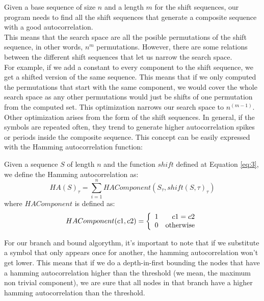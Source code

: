   Given a base sequence of size $n$ and a length $m$ for the shift sequences,
  our program needs to find all the shift sequences that generate a composite
  sequence with a good autocorrelation.\\

  This means that the search space are all the posible permutations of the
  shift sequence, in other words, $n^m$ permutations. However, there are some
  relations between the different shift sequences that let us narrow the
  search space.\\

  For example, if we add a constant to every component to the shift sequence,
  we get a shifted version of the same sequence. This means that if we only
  computed the permutations that start with the same component, we would cover
  the whole search space as any other permutations would just be shifts of
  one permutation from the computed set. This optimization narrows our
  search space to $n^{(m-1)}$.\\

  Other optimization arises from the form of the shift sequences. In general,
  if the symbols are repeated often, they trend to generate higher
  autocorrelation spikes or periods inside the composite sequence. This
  concept can be easily expressed with the Hamming autocorrelation function:\\

  \begin{definition}
    Given a sequence $S$ of length $n$ and the function $shift$ defined at
    Equation \eqref{eq:3}, we define the Hamming autocorrelation as:
      \begin{equation} \label{hamming:eq:1}
        HA(S)_{\tau} = \sum_{i=1}^{n} HAComponent(S_{\tau}, shift(S, \tau)_{\tau})
      \end{equation}
    where $HAComponent$ is defined as:
      \begin{equation}
        HAComponent(c1, c2) = \left\{\begin{array}{lr}
            1  &  c1 = c2\\
            0  & \textnormal{otherwise} \\
        \end{array}\right.
      \end{equation}
  \end{definition}

  For our branch and bound algorythm, it's important to note that if we
  substitute a symbol that only appears once for another, the hamming
  autocorrelation won't get lower. This means that if we do a depth-in-first
  bounding the nodes that have a hamming autocorrelation higher than the
  threshold (we mean, the maximum non trivial component), we are sure that all
  nodes in that branch have a higher hamming autocorrelation than the
  threshold.\\

